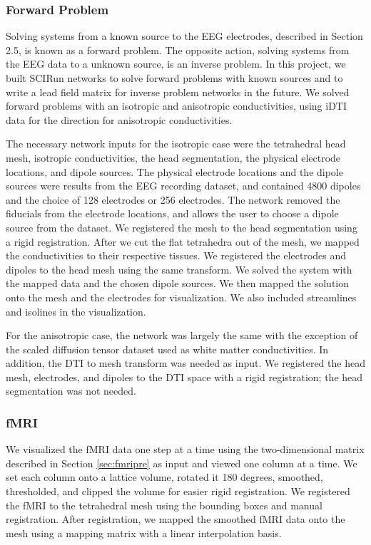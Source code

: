 \subsubsection{Forward Problem}

Solving systems from a known source to the EEG electrodes, described in Section 2.5, is known as a forward problem. The opposite action, solving systems from the EEG data to a unknown source, is an inverse problem.  In this project, we built SCIRun networks to solve forward problems with known sources and to write a lead field matrix for inverse problem networks in the future. We solved forward problems with an isotropic and anisotropic conductivities, using iDTI data for the direction for anisotropic conductivities.

The necessary network inputs for the isotropic case were the tetrahedral head mesh, isotropic conductivities, the head segmentation, the physical electrode locations, and dipole sources. The physical electrode locations and the dipole sources were results from the EEG recording dataset, and contained 4800 dipoles and the choice of 128 electrodes or 256 electrodes. The network removed the fiducials from the electrode locations, and allows the user to choose a dipole source from the dataset. We registered the mesh to the head segmentation using a rigid registration. After we cut the flat tetrahedra out of the mesh, we mapped the conductivities to their respective tissues. We registered the electrodes and dipoles to the head mesh using the same transform. We solved the system with the mapped data and the chosen dipole sources. We then mapped the solution onto the mesh and the electrodes for visualization. We also included streamlines and isolines in the visualization.

For the anisotropic case, the network was largely the same with the exception of the scaled diffusion tensor dataset used as white matter conductivities. In addition, the DTI to mesh transform was needed as input. We registered the head mesh, electrodes, and dipoles to the DTI space with a rigid registration; the head segmentation was not needed.

\subsubsection{fMRI}

We visualized the fMRI data one step at a time using the two-dimensional matrix described in Section \ref{sec:fmripre} as input and viewed one column at a time. We set each column onto a lattice volume, rotated it 180 degrees, smoothed, thresholded, and clipped the volume for easier rigid registration. We registered the fMRI to the tetrahedral mesh using the bounding boxes and manual registration. After registration, we mapped the smoothed fMRI data onto the mesh using a mapping matrix with a linear interpolation basis.

